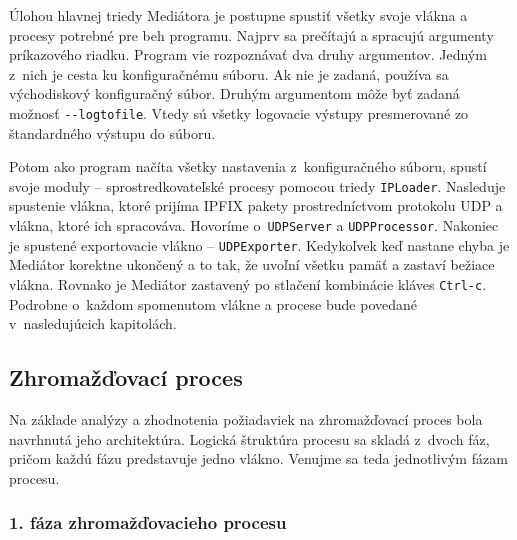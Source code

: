 Úlohou hlavnej triedy Mediátora je postupne spustiť všetky svoje vlákna a procesy potrebné pre beh 
programu. Najprv sa prečítajú a spracujú argumenty príkazového riadku. Program vie rozpoznávať dva druhy 
argumentov. Jedným z~nich je cesta ku konfiguračnému súboru. Ak nie je zadaná, používa sa východiskový 
konfiguračný súbor. Druhým argumentom môže byť zadaná možnosť \verb|--logtofile|. Vtedy sú všetky 
logovacie výstupy presmerované zo štandardného výstupu do súboru.

Potom ako program načíta všetky nastavenia z~konfiguračného súboru, spustí svoje moduly -- 
sprostredkovateľské procesy pomocou triedy \verb|IPLoader|. Nasleduje spustenie vlákna, ktoré prijíma 
IPFIX pakety prostredníctvom protokolu UDP a vlákna, ktoré ich spracováva. Hovoríme o~\verb|UDPServer| 
a \verb|UDPProcessor|. Nakoniec je spustené exportovacie vlákno -- \verb|UDPExporter|. Kedykoľvek keď 
nastane chyba je Mediátor korektne ukončený a to tak, že uvoľní všetku pamäť a zastaví bežiace vlákna. 
Rovnako je Mediátor zastavený po stlačení kombinácie kláves \verb|Ctrl-c|.
Podrobne o~každom spomenutom vlákne a procese bude povedané v~nasledujúcich kapitolách.







\subsection{Zhromažďovací proces} \label{sec:collectingprocess}

Na základe analýzy a zhodnotenia požiadaviek na zhromažďovací proces bola navrhnutá jeho architektúra.
Logická štruktúra procesu sa skladá z~dvoch fáz, pričom každú fázu predstavuje jedno vlákno. 
Venujme sa teda jednotlivým fázam procesu.

\subsubsection{1. fáza zhromažďovacieho procesu}

